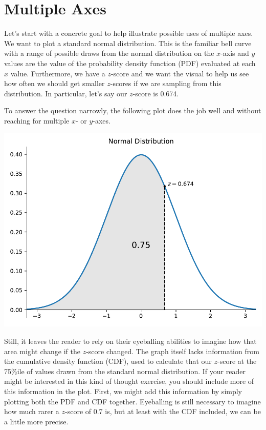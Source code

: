 \section{Multiple Axes}

Let's start with a concrete goal to help illustrate possible uses of multiple axes. We want to plot a standard normal distribution. This is the familiar bell curve with a range of possible draws from the normal distribution on the $x$-axis and $y$ values are the value of the probability density function (PDF) evaluated at each $x$ value. Furthermore, we have a $z$-score and we want the visual to help us see how often we should get smaller $z$-scores if we are sampling from this distribution. In particular, let's say our $z$-score is 0.674. 

To answer the question narrowly, the following plot does the job well and without reaching for multiple $x$- or $y$-axes. 


\begin{center}
\includegraphics[width = .7\textwidth]{figures/proseplots/norm-pdf.pdf}
\end{center}

Still, it leaves the reader to rely on their eyeballing abilities to imagine how that area might change if the $z$-score changed. The graph itself lacks information from the cumulative density function (CDF), used to calculate that our $z$-score at the 75\%ile of values drawn from the standard normal distribution. If your reader might be interested in this kind of thought exercise, you should include more of this information in the plot. First, we might add this information by simply plotting both the PDF and CDF together. Eyeballing is still necessary to imagine how much rarer a $z$-score of 0.7 is, but at least with the CDF included, we can be a little more precise. 

